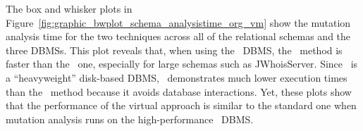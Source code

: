 
 The box and whisker plots in Figure~\ref{fig:graphic_bwplot_schema_analysistime_org_vm} show the mutation analysis time for the two techniques across all of the relational schemas and the three DBMSs. This plot reveals that, when using the \HyperSQL~DBMS, the \virtual~method is faster than the \Original~one, especially for large schemas such as JWhoisServer. Since \Postgres~is a ``heavyweight'' disk-based DBMS, \vma~demonstrates much lower execution times than the \Original~method because it avoids database interactions. Yet, these plots show that the performance of the virtual approach is similar to the standard one when mutation analysis runs on the high-performance \sqlite~DBMS.





